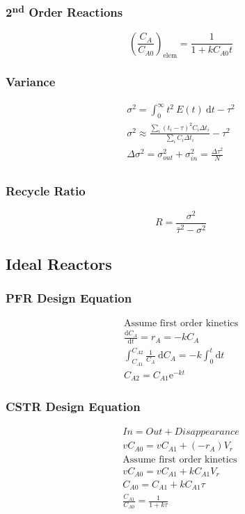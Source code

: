 \documentclass[10pt, oneside, twocolumn]{article}
\numberwithin{equation}{section}
\begin{document}
		\subsubsection{2\textsuperscript{nd} Order Reactions}
			\begin{equation}
			{\left(\frac{C_A}{C_{A0}}\right)}_{\mathrm{elem}}=\frac{1}{1+kC_{A0}t}
			\end{equation}
		\subsubsection{Variance}
			\begin{gather}
			\sigma^2=\int_0^\infty t^2 \ E(t)\ \mathrm{d}t - \tau^2\\
			\sigma^2\approx\frac{\sum_i{(t_i-\tau)}^2C_i\Delta t_i}{\sum_iC_i\Delta t_i}-\tau^2\\
			\Delta \sigma^2=\sigma^2_{out}+\sigma^2_{in}=\frac{\Delta \tau^2}{N}\\
			\end{gather}
		\subsubsection{Recycle Ratio}
			\begin{equation}
			R=\frac{\sigma^2}{{\bar{\tau}}^2-\sigma^2}
			\end{equation}
			\begin{sidewaysfigure}[h!]
				\centering
				
			\end{sidewaysfigure}
			
	\subsection{Ideal Reactors}
		\subsubsection{PFR Design Equation}
			\begin{gather*}
			\textrm{Assume first order kinetics}\\
			\frac{\mathrm{d}C_A}{\mathrm{d}t}=r_A=-kC_A\\
			\int_{C_{A1}}^{C_{A2}} \frac{1}{C_A} \ \mathrm{d}C_A=-k\int_0^t \mathrm{d}t\\
			C_{A2}=C_{A1}\mathrm{e}^{-kt}			
			\end{gather*}
		\subsubsection{CSTR Design Equation}
			\begin{gather*}
			In=Out+Disappearance\\
			vC_{A0}=vC_{A1}+(-r_A)V_r\\
			\textrm{Assume first order kinetics}\\
			vC_{A0}=vC_{A1}+kC_{A1}V_r\\
			C_{A0}=C_{A1}+kC_{A1}\tau\\
			\frac{C_{A1}}{C_{A0}}=\frac{1}{1+k\tau}
			\end{gather*}
\end{document}
